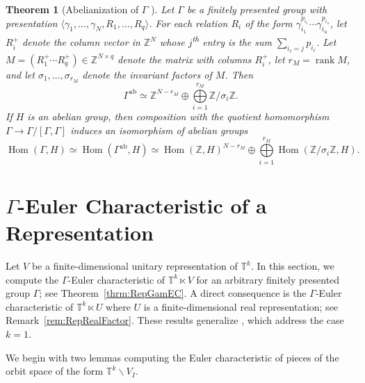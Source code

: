 \documentclass[twoside]{amsart}
\newtheorem{theorem}{Theorem}[section]
\theoremstyle{definition}
\theoremstyle{remark}
\numberwithin{equation}{section}
\newcommand{\T}{\mathbb{T}}
\newcommand{\Z}{\mathbb{Z}}
\newcommand{\Rank}{\operatorname{rank}}
\newcommand{\ab}{\text{ab}}
\newcommand{\HOM}{\operatorname{Hom}}
\begin{document}
\begin{theorem}[Abelianization of $\Gamma$ {\cite[Prop.~2.68 and Sec.~9.2]{HoltEickOBrienBook}}]
\label{thrm:SmithAbelianization}
Let $\Gamma$ be a finitely presented group with presentation $\langle \gamma_1,\ldots,\gamma_N, R_1,\ldots,R_q\rangle$. For each relation $R_i$
of the form $\gamma_{i_1}^{p_{i_1}}\cdots\gamma_{i_u}^{p_{i_u}}$, let $R_i^+$ denote the column vector in $\Z^N$ whose $j$\textsuperscript{th}
entry is the sum $\sum_{i_\ell = j} p_{i_\ell}$. Let $M = (R_1^+ \cdots R_q^+)\in\Z^{N\times q}$
denote the matrix with columns $R_i^+$, let $r_M = \Rank M$, and let $\sigma_1,\ldots,\sigma_{r_M}$ denote the invariant factors of $M$. Then
\[
    \Gamma^{\ab}    \simeq
    \Z^{N - r_M} \oplus \bigoplus\limits_{i=1}^{r_M} \Z/\sigma_i\Z.
\]
If $H$ is an abelian group, then composition with the quotient homomorphism $\Gamma\to\Gamma/[\Gamma,\Gamma]$ induces an isomorphism of abelian groups
\[
    \HOM(\Gamma, H)
    \simeq
    \HOM(\Gamma^{\ab}, H)
    \simeq
    \HOM(\Z, H)^{N - r_M} \oplus \bigoplus\limits_{i=1}^{r_M} \HOM(\Z/\sigma_i\Z, H).
\]
\end{theorem}




\section{$\Gamma$-Euler Characteristic of a Representation}
\label{sec:GamECFulLRep}

Let $V$ be a finite-dimensional unitary representation of $\T^k$. In this section, we compute the $\Gamma$-Euler characteristic of
$\T^k\ltimes V$ for an arbitrary finitely presented group $\Gamma$; see Theorem~\ref{thrm:RepGamEC}. A direct consequence is the
$\Gamma$-Euler characteristic of $\T^k\ltimes U$ where $U$ is a finite-dimensional real representation; see Remark~\ref{rem:RepRealFactor}.
These results generalize \cite[Thrm.~4.1 and Cor.~4.3]{FarsiMeitSeaton}, which address the case $k = 1$.

We begin with two lemmas computing the Euler characteristic of pieces of the orbit space of the form $\T^k\backslash V_I$.
\end{document}
